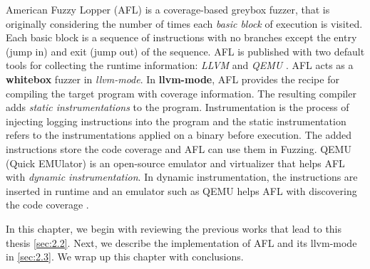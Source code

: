 American Fuzzy Lopper (AFL) \cite{afl_git} is a coverage-based greybox fuzzer, that is originally considering the number of times each \textit{basic block} of execution is visited. Each basic block is a sequence of instructions with no branches except the entry (jump in) and exit (jump out) of the sequence. AFL is published with two default tools for collecting the runtime information: \textit{LLVM} \cite{llvm} and \textit{QEMU} \cite{bellard2005qemu}.  AFL acts as a \textbf{whitebox} fuzzer in \textit{llvm-mode}. In \textbf{llvm-mode}, AFL provides the recipe for compiling the target program with coverage information. The resulting compiler adds \textit{static instrumentations} to the program. Instrumentation is the process of injecting logging instructions into the program and the static instrumentation refers to the instrumentations applied on a binary before execution. The added instructions store the code coverage and AFL can use them in Fuzzing. QEMU (Quick EMUlator) is an open-source emulator and virtualizer that helps AFL with \textit{dynamic instrumentation}. In dynamic instrumentation, the instructions are inserted in runtime and an emulator such as QEMU helps AFL with discovering the code coverage \cite{afl_qemu}.

In this chapter, we begin with reviewing the previous works that lead to this thesis \ref{sec:2.2}. Next, we describe the implementation of AFL and its llvm-mode in \ref{sec:2.3}. We wrap up this chapter with conclusions.
